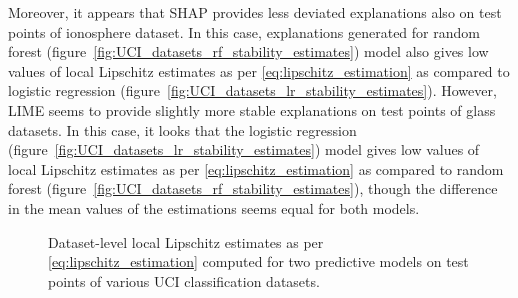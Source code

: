 \documentclass[english]{tktltiki2}
\theoremstyle{definition}
\theoremstyle{remark}
\begin{document}
Moreover, it appears that SHAP provides less deviated explanations also on test points of ionosphere dataset. In this case, explanations generated for random forest (figure~\ref{fig:UCI_datasets_rf_stability_estimates}) model also gives low values of local Lipschitz estimates as per \eqref{eq:lipschitz_estimation} as compared to logistic regression (figure~\ref{fig:UCI_datasets_lr_stability_estimates}). However, LIME seems to provide slightly more stable explanations on test points of glass datasets. In this case, it looks that the logistic regression (figure~\ref{fig:UCI_datasets_lr_stability_estimates}) model gives low values of local Lipschitz estimates as per \eqref{eq:lipschitz_estimation} as compared to random forest (figure~\ref{fig:UCI_datasets_rf_stability_estimates}), though the difference in the mean values of the estimations seems equal for both models.

\begin{figure}[H]
	\hspace*{\fill}%
	\caption{Dataset-level local Lipschitz estimates as per \eqref{eq:lipschitz_estimation} computed for two predictive models on test points of various UCI classification datasets.}%
	\label{fig:UCI_datasets_stability_estimates}%
\end{figure}


\end{document}
